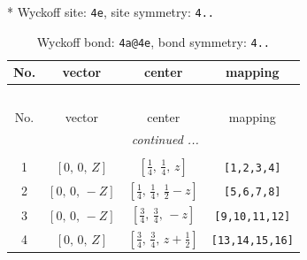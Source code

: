 \documentclass[fleqn,8pt]{jsarticle}
\begin{document}
* Wyckoff site: {\tt 4e}, site symmetry: {\tt 4..}
\renewcommand{\arraystretch}{1.2}
\begin{longtable}{cccc}
\caption{Wyckoff bond: {\tt 4a@4e}, bond symmetry: {\tt 4..}}
 \\
 \hline \hline
No. & vector & center & mapping \\ \hline \endfirsthead

\multicolumn{3}{l}{\tablename\ \thetable{}} \\
 \hline \hline
No. & vector & center & mapping \\ \hline \endhead

 \hline \hline
\multicolumn{3}{r}{\footnotesize\it continued ...} \\ \endfoot

 \hline \hline
\multicolumn{3}{r}{} \\ \endlastfoot

1 & $\left[ 0,\, 0,\, Z \right]$ & $\left[ \frac{1}{4},\, \frac{1}{4},\, z \right]$ & {\tt [1,2,3,4]} \\ \hline
2 & $\left[ 0,\, 0,\, - Z \right]$ & $\left[ \frac{1}{4},\, \frac{1}{4},\, \frac{1}{2} - z \right]$ & {\tt [5,6,7,8]} \\ \hline
3 & $\left[ 0,\, 0,\, - Z \right]$ & $\left[ \frac{3}{4},\, \frac{3}{4},\, - z \right]$ & {\tt [9,10,11,12]} \\ \hline
4 & $\left[ 0,\, 0,\, Z \right]$ & $\left[ \frac{3}{4},\, \frac{3}{4},\, z + \frac{1}{2} \right]$ & {\tt [13,14,15,16]} \\
\end{longtable}
\renewcommand{\arraystretch}{1.2}
\end{document}
